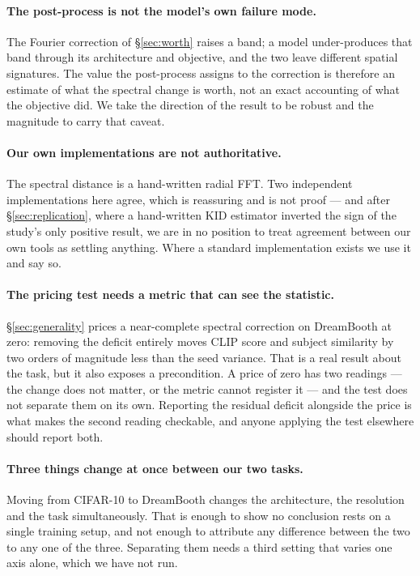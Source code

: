 \paragraph{The post-process is not the model's own failure mode.}
The Fourier correction of \S\ref{sec:worth} raises a band; a model
under-produces that band through its architecture and objective, and the two
leave different spatial signatures. The value the post-process assigns to the
correction is therefore an estimate of what the spectral change is worth, not
an exact accounting of what the objective did. We take the direction of the
result to be robust and the magnitude to carry that caveat.

\paragraph{Our own implementations are not authoritative.}
The spectral distance is a hand-written radial FFT. Two independent
implementations here agree, which is reassuring and is not proof --- and after
\S\ref{sec:replication}, where a hand-written KID estimator inverted the sign
of the study's only positive result, we are in no position to treat agreement
between our own tools as settling anything. Where a standard implementation
exists we use it and say so.

\paragraph{The pricing test needs a metric that can see the statistic.}
\S\ref{sec:generality} prices a near-complete spectral correction on DreamBooth
at zero: removing the deficit entirely moves CLIP score and subject similarity
by two orders of magnitude less than the seed variance. That is a real result
about the task, but it also exposes a precondition. A price of zero has two
readings --- the change does not matter, or the metric cannot register it ---
and the test does not separate them on its own. Reporting the residual deficit
alongside the price is what makes the second reading checkable, and anyone
applying the test elsewhere should report both.

\paragraph{Three things change at once between our two tasks.}
Moving from CIFAR-10 to DreamBooth changes the architecture, the resolution and
the task simultaneously. That is enough to show no conclusion rests on a single
training setup, and not enough to attribute any difference between the two to
any one of the three. Separating them needs a third setting that varies one
axis alone, which we have not run.


